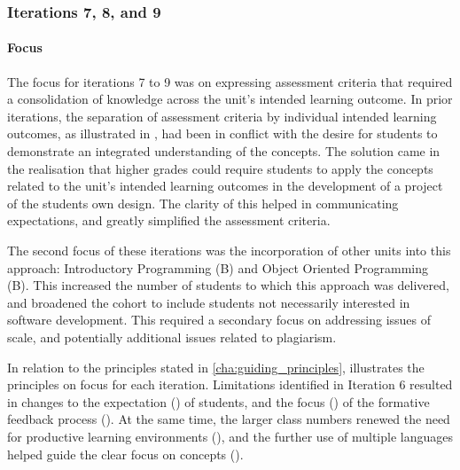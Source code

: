 \subsubsection{Iterations 7, 8, and 9} %
\label{sub:iterations_7_to_9}

\paragraph{Focus} %

The focus for iterations 7 to 9 was on expressing assessment criteria that required a consolidation of knowledge across the unit's intended learning outcome. In prior iterations, the separation of assessment criteria by individual intended learning outcomes, as illustrated in , had been in conflict with the desire for students to demonstrate an integrated understanding of the concepts. The solution came in the realisation that higher grades could require students to apply the concepts related to the unit's intended learning outcomes in the development of a project of the students own design. The clarity of this helped in communicating expectations, and greatly simplified the assessment criteria. 

The second focus of these iterations was the incorporation of other units into this approach: Introductory Programming (B) and Object Oriented Programming (B). This increased the number of students to which this approach was delivered, and broadened the cohort to include students not necessarily interested in software development. This required a secondary focus on addressing issues of scale, and potentially additional issues related to plagiarism.

In relation to the principles stated in \cref{cha:guiding_principles},  illustrates the principles on focus for each iteration. Limitations identified in Iteration 6 resulted in changes to the expectation () of students, and the focus () of the formative feedback process (). At the same time, the larger class numbers renewed the need for productive learning environments (), and the further use of multiple languages helped guide the clear focus on concepts ().

